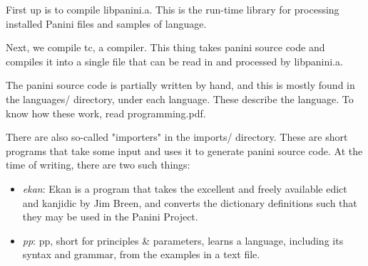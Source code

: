 \documentclass{article}
\begin{document}
First up is to compile libpanini.a. This is the run-time library for
processing installed Panini files and samples of language.

Next, we compile tc, a compiler. This thing takes panini source code and
compiles it into a single file that can be read in and processed by libpanini.a.

The panini source code is partially written by hand, and this is mostly found in
the languages/ directory, under each language. These describe the language. To
know how these work, read programming.pdf.

There are also so-called "importers" in the imports/ directory. These are short
programs that take some input and uses it to generate panini source code. At the
time of writing, there are two such things:

\begin{itemize}
\item \emph{ekan}: Ekan is a program that takes the excellent and freely
available edict and kanjidic by Jim Breen, and converts the dictionary
definitions such that they may be used in the Panini Project.
\item \emph{pp}: pp, short for principles \& parameters, learns a language,
including its syntax and grammar, from the examples in a text file.
\end{itemize}


\label{end}
\end{document}
